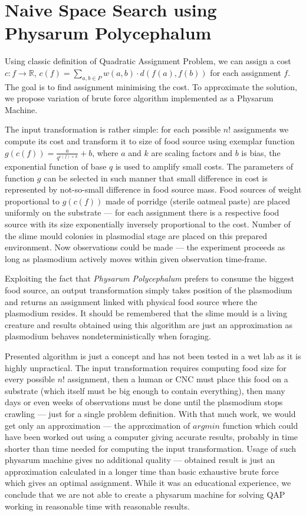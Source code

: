 \section{Naive Space Search using Physarum Polycephalum}
\label{section:algorithm_naive}

Using classic definition of Quadratic Assignment Problem, we can assign a cost $c : f \rightarrow \mathbb{R}$, $c(f) = \sum_{a,b\in P}w(a,b)\cdot d(f(a), f(b))$ for each assignment $f$. The goal is to find assignment minimising the cost. To approximate the solution, we propose variation of brute force algorithm implemented as a Physarum Machine.

The input transformation is rather simple: for each possible $n!$ assignments we compute its cost and transform it to size of food source using exemplar function $g(c(f)) = \frac{a}{q^{c(f)+k}}+b$, where $a$ and $k$ are scaling factors and $b$ is bias, the exponential function of base $q$ is used to amplify small costs. The parameters of function $g$ can be selected in such manner that small difference in cost is represented by not-so-small difference in food source mass. Food sources of weight proportional to $g(c(f))$ made of porridge (sterile oatmeal paste) are placed uniformly on the substrate --- for each assignment there is a respective food source with its size exponentially inversely proportional to the cost. Number of the slime mould colonies in plasmodial stage are placed on this prepared environment. Now observations could be made --- the experiment proceeds as long as plasmodium actively moves within given observation time-frame. 

Exploiting the fact that \textit{Physarum Polycephalum} prefers to consume the biggest food source, an output transformation simply takes position of the plasmodium and returns an assignment linked with physical food source where the plasmodium resides. It should be remembered that the slime mould is a living creature and results obtained using this algorithm are just an approximation as plasmodium behaves nondeterministically when foraging.

Presented algorithm is just a concept and has not been tested in a wet lab as it is highly unpractical. The input transformation requires computing food size for every possible $n!$ assignment, then a human or CNC must place this food on a substrate (which itself must be big enough to contain everything), then many days or even weeks of observations must be done until the plasmodium stops crawling --- just for a single problem definition. With that much work, we would get only an approximation --- the approximation of $argmin$ function which could have been worked out using a computer giving accurate results, probably in time shorter than time needed for computing the input transformation. Usage of such physarum machine gives no additional quality --- obtained result is just an approximation calculated in a longer time than basic exhaustive brute force which gives an optimal assignment. While it was an educational experience, we conclude that we are not able to create a physarum machine for solving QAP working in reasonable time with reasonable results.
